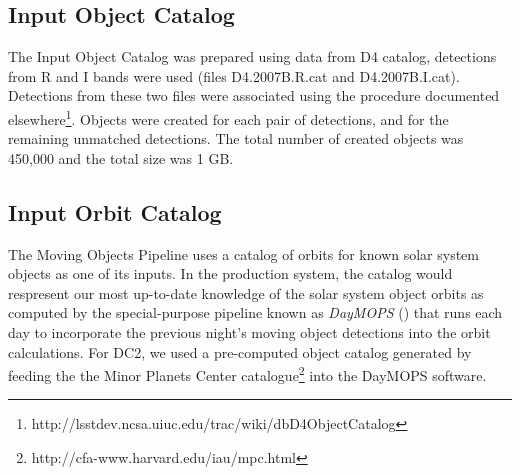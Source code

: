 \subsection{Input Object Catalog}

The Input Object Catalog was prepared using data from D4 catalog,
detections from R and I bands were used (files D4.2007B.R.cat and 
D4.2007B.I.cat). Detections from these two files were associated
using the procedure documented 
elsewhere\footnote{http://lsstdev.ncsa.uiuc.edu/trac/wiki/dbD4ObjectCatalog}.
Objects were created for each pair of detections, and for the remaining 
unmatched detections. The total number of created objects was 450,000
and the total size was 1 GB.

\subsection{Input Orbit Catalog}

The Moving Objects Pipeline uses a catalog of orbits for known solar
system objects as one of its inputs.  In the production system, the
catalog would respresent our most up-to-date knowledge of the solar
system object orbits as computed by the special-purpose pipeline known
as \textit{DayMOPS} () that runs each day to incorporate
the previous night's moving object detections into the orbit
calculations.  For DC2, we used a pre-computed object catalog
generated by feeding the the Minor Planets Center 
catalogue\footnote{http://cfa-www.harvard.edu/iau/mpc.html} into
the DayMOPS software.

